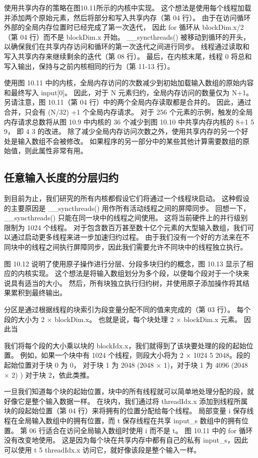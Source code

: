 使用共享内存的策略在图10.11所示的内核中实现。 
这个想法是使用每个线程加载并添加两个原始元素，然后将部分和写入共享内存（第 04 行）。 
由于在访问循环外部的全局内存位置时已经完成了第一次迭代，
因此 for 循环从 blockDim.x/2 （第 04 行）而不是 blockDim.x 开始。 
\_\_syncthreads() 被移动到循环的开头，以确保我们在共享内存访问和循环的第一次迭代之间进行同步。 
线程通过读取和写入共享内存来继续剩余的迭代（第 08 行）。 
最后，在内核末尾，线程 0 将总和写入输出，保持与之前内核相同的行为（第 11-13 行）。

使用图 10.11 中的内核，全局内存访问的次数减少到初始加载输入数组的原始内容和最终写入 input[0]。 
因此，对于 N 元素归约，全局内存访问的数量仅为 N+1。 另请注意，图 10.11（第 04 行）中的两个全局内存读取都是合并的。 
因此，通过合并，只会有 (N/32) +1 个全局内存请求。 
对于 256 个元素的示例，触发的全局内存请求总数将从图 10.9 中内核的 36 个减少到图 10.10 中共享内存内核的 8+1 5 9，
即 4 3 的改进。 除了减少全局内存访问次数之外，使用共享内存的另一个好处是输入数组不会被修改。 
如果程序的另一部分中的某些其他计算需要数组的原始值，则此属性非常有用。

\subsection{任意输入长度的分层归约}
到目前为止，我们研究的所有内核都假设它们将通过一个线程块启动。 
这种假设的主要原因是 \_\_syncthreads() 用作所有活动线程之间的屏障同步。 
回想一下，\_\_syncthreads() 只能在同一块中的线程之间使用。 这将当前硬件上的并行级别限制为 1024 个线程。 
对于包含数百万甚至数十亿个元素的大型输入数组，我们可以通过启动更多线程来进一步加速归约过程。 
由于我们没有一个好的方法来在不同块中的线程之间执行屏障同步，因此我们需要允许不同块中的线程独立执行。

图 10.12 说明了使用原子操作进行分层、分段多块归约的概念，图 10.13 显示了相应的内核实现。 
这个想法是将输入数组划分为多个段，以便每个段对于一个块来说具有适当的大小。 
然后，所有块独立执行归约树，并使用原子添加操作将其结果累积到最终输出。

分区是通过根据线程的块索引为段变量分配不同的值来完成的（第 03 行）。 每个段的大小为 2 × blockDim.x。 
也就是说，每个块处理 2 × blockDim.x 元素。 因此当

我们将每个段的大小乘以块的 blockIdx.x，我们就得到了该块要处理的段的起始位置。 
例如，如果一个块中有 1024 个线程，则段大小将为 2 × 1024 5 2048。段的起始位置对于块 0 为 0，
对于块 1 为 2048 (2048 × 1)，对于块 1 为 4096 (2048 × 2) ) 对于块 2，依此类推。

一旦我们知道每个块的起始位置，块中的所有线程就可以简单地处理分配的段，就好像它是整个输入数据一样。 
在块内，我们通过将 threadIdx.x 添加到线程所属块的段起始位置（第 04 行）来将拥有的位置分配给每个线程。 
局部变量 i 保存线程在全局输入数组中的拥有位置，而 t 保存线程在共享 input\_s 数组中的拥有位置。 
第 06 行适合在访问全局输入数组时使用 i 而不是 t。 图 10.11 中的 for 循环没有改变地使用。 
这是因为每个块在共享内存中都有自己的私有 input\_s，因此可以使用 t 5 threadIdx.x 访问它，就好像该段是整个输入一样。

